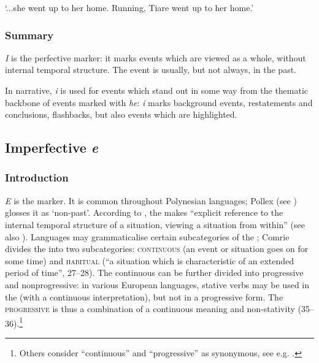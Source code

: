\glt 
‘...she went up to her home. Running, Tiare went up to her home.’ \textstyleExampleref{[R151.053]} 
\z

\subsubsection[Summary]{Summary}\label{sec:7.2.4.3}

\textit{I} is the perfective marker: it marks events which are viewed as a whole, without internal temporal structure. The event is usually, but not always, in the past. 

In narrative, \textit{i} is used for events which stand out in some way from the thematic backbone of events marked with \textit{he}: \textit{i} marks background events, restatements and conclusions, flashbacks, but also events which are highlighted.
\subsection{Imperfective \textit{e}}\label{sec:7.2.5}
\subsubsection[Introduction]{Introduction}\label{sec:7.2.5.1}

\textit{E} is the  marker. It is common throughout Polynesian languages; Pollex (see \citealt{GreenhillClark2011}) glosses it as ‘non-past’. According to \citet[24]{Comrie1976}, the  makes “explicit reference to the internal temporal structure of a situation, viewing a situation from within” (see also \citealt[35]{Dixon2012}). Languages may grammaticalise certain subcategories of the ; Comrie divides the  into two subcategories: \textsc{continuous} (an event or situation goes on for some time) and \textsc{habitual} (“a situation which is characteristic of an extended period of time”, 27–28). The continuous can be further divided into progressive and nonprogressive: in various European languages, stative verbs may be used in the  (with a continuous interpretation), but not in a progressive form. The \textsc{progressive} is thus a combination of a continuous meaning and non-stativity (35–36).\footnote{\label{fn:322}Others consider “continuous” and “progressive” as synonymous, see e.g. \citet[34]{Dixon2012}.} 

